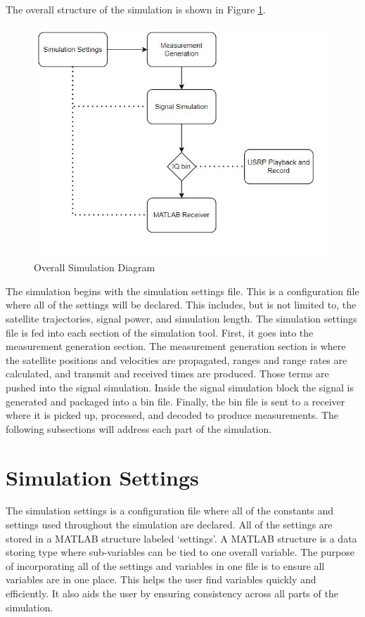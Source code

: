 \documentclass[12pt]{report}
\begin{document}
The overall structure of the simulation is shown in Figure \ref{fig:SimDiagram}.

\begin{figure}[ht]
    \centering
    \includegraphics[width=6.0in]{OverallSimulationDiagram}
    \caption{Overall Simulation Diagram}
    \label{fig:SimDiagram}
\end{figure}

The simulation begins with the simulation settings file. This is a configuration file where all of the settings will be declared. This includes, but is not limited to, the satellite trajectories, signal power, and simulation length. The simulation settings file is fed into each section of the simulation tool. First, it goes into the measurement generation section. The measurement generation section is where the satellite positions and velocities are propagated, ranges and range rates are calculated, and transmit and received times are produced. Those terms are pushed into the signal simulation. Inside the signal simulation block the signal is generated and packaged into a bin file. Finally, the bin file is sent to a receiver where it is picked up, processed, and decoded to produce measurements. The following subsections will address each part of the simulation.

\section{Simulation Settings}

The simulation settings is a configuration file where all of the constants and settings used throughout the simulation are declared. All of the settings are stored in a MATLAB structure labeled `settings'. A MATLAB structure is a data storing type where sub-variables can be tied to one overall variable. The purpose of incorporating all of the settings and variables in one file is to ensure all variables are in one place. This helps the user find variables quickly and efficiently. It also aids the user by ensuring consistency across all parts of the simulation. 
\end{document}
